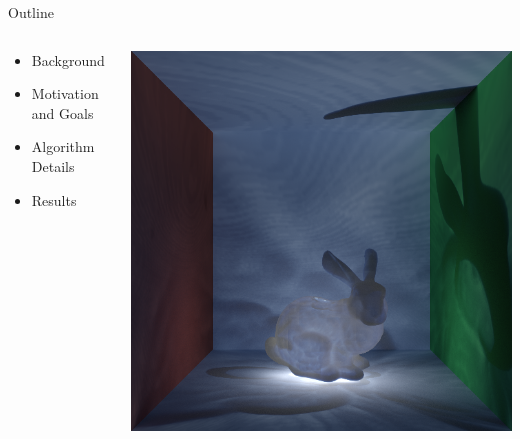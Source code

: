 \documentclass[10pt,compress,professionalfont]{beamer}
\begin{document}
\begin{frame}{Outline}

    \begin{columns}
        \begin{column}{0.5\textwidth}

            \vspace{-4mm}
            \begin{itemize}
                \item Background\\ \vspace{2mm}
                \item Motivation and Goals\\ \vspace{2mm}
                \item Algorithm Details\\ \vspace{2mm}
                \item Results
            \end{itemize}
        \end{column}
        \begin{column}{0.5\textwidth}
            \includegraphics[width=\textwidth]{../img/bunny_glow}
        \end{column}
    \end{columns}

\end{frame}
\end{document}
